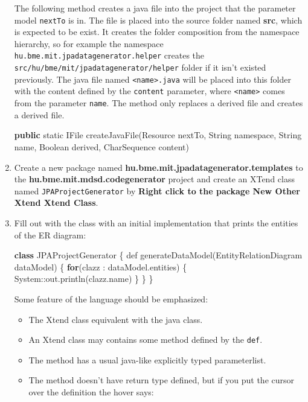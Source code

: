 \documentclass[]{report}
\newenvironment{Shaded}{}{}
\newcommand{\KeywordTok}[1]{\textcolor[rgb]{0.00,0.44,0.13}{\textbf{{#1}}}}
\newcommand{\DataTypeTok}[1]{\textcolor[rgb]{0.56,0.13,0.00}{{#1}}}
\newcommand{\FunctionTok}[1]{\textcolor[rgb]{0.02,0.16,0.49}{{#1}}}
\newcommand{\NormalTok}[1]{{#1}}
\begin{document}
\begin{enumerate}
  The following method creates a java file into the project that the
  parameter model \texttt{nextTo} is in. The file is placed into the
  source folder named \textbf{src}, which is expected to be exist. It
  creates the folder composition from the namespace hierarchy, so for
  example the namespace \texttt{hu.bme.mit.jpadatagenerator.helper}
  creates the \texttt{src/hu/bme/mit/jpadatagenerator/helper} folder if
  it isn't existed previously. The java file named
  \texttt{\textless{}name\textgreater{}.java} will be placed into this
  folder with the content defined by the \texttt{content} parameter,
  where \texttt{\textless{}name\textgreater{}} comes from the parameter
  \texttt{name}. The method only replaces a derived file and creates a
  derived file.

\begin{Shaded}
\begin{Highlighting}[]
\KeywordTok{public} \DataTypeTok{static} \NormalTok{IFile }\FunctionTok{createJavaFile}\NormalTok{(Resource nextTo, String namespace,}
        \NormalTok{String name, Boolean derived, CharSequence content)}
\end{Highlighting}
\end{Shaded}
\item
  Create a new package named
  \textbf{hu.bme.mit.jpadatagenerator.templates} to the
  \textbf{hu.bme.mit.mdsd.codegenerator} project and create an XTend
  class named \texttt{JPAProjectGenerator} by \textbf{Right click to the
  package \textbar{} New \textbar{} Other \textbar{} Xtend \textbar{}
  Xtend Class}.
\item
  Fill out with the class with an initial implementation that prints the
  entities of the ER diagram:

\begin{Shaded}
\begin{Highlighting}[]
\KeywordTok{class} \NormalTok{JPAProjectGenerator \{}
    \NormalTok{def }\FunctionTok{generateDataModel}\NormalTok{(EntityRelationDiagram dataModel) \{}
        \KeywordTok{for}\NormalTok{(clazz : dataModel.}\FunctionTok{entities}\NormalTok{) \{}
            \NormalTok{System::out.}\FunctionTok{println}\NormalTok{(clazz.}\FunctionTok{name}\NormalTok{)}
        \NormalTok{\}}
    \NormalTok{\}}
\NormalTok{\}}
\end{Highlighting}
\end{Shaded}

  Some feature of the language should be emphasized:

  \begin{itemize}
  \item
    The Xtend class equivalent with the java class.
  \item
    An Xtend class may contains some method defined by the \texttt{def}.
  \item
    The method has a usual java-like explicitly typed parameterlist.
  \item
    The method doesn't have return type defined, but if you put the
    cursor over the definition the hover says:


\end{itemize}
\end{enumerate}
\end{document}
